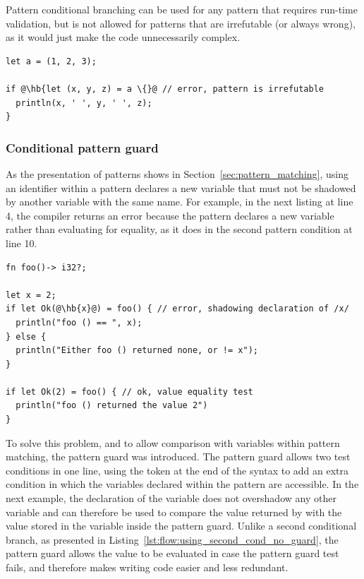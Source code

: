 Pattern conditional branching can be used for any pattern that requires run-time
validation, but is not allowed for patterns that are irrefutable (or always
wrong), as it would just make the code unnecessarily complex.

\begin{lstlisting}[style=coloredverbatimError, escapechar=@]
let a = (1, 2, 3);

if @\hb{let (x, y, z) = a \{}@ // error, pattern is irrefutable
  println(x, ' ', y, ' ', z);
}
\end{lstlisting}

\subsubsection{Conditional pattern guard}

As the presentation of patterns shows in
Section~\ref{sec:pattern_matching}, using an identifier within a pattern
declares a new variable that must not be shadowed by another variable with the
same name. For example, in the next listing at line 4, the compiler returns an
error because the pattern declares a new variable  rather than
evaluating for equality, as it does in the second pattern condition at line 10.

\begin{lstlisting}[style=coloredverbatimError, escapechar=@]
fn foo()-> i32?;

let x = 2;
if let Ok(@\hb{x}@) = foo() { // error, shadowing declaration of /x/
  println("foo () == ", x);
} else {
  println("Either foo () returned none, or != x");
}

if let Ok(2) = foo() { // ok, value equality test
  println("foo () returned the value 2")
}
\end{lstlisting}

To solve this problem, and to allow comparison with variables within pattern
matching, the pattern guard was introduced. The pattern guard allows two test
conditions in one line, using the token \token{\&\&} at the end of the syntax
 to add an extra condition in which the
variables declared within the pattern are accessible. In the next example, the
declaration of the variable  does not overshadow any other variable and
can therefore be used to compare the value returned by  with the
value stored in the variable  inside the pattern guard. Unlike a second
conditional branch, as presented in
Listing~\ref{lst:flow:using_second_cond_no_guard}, the pattern guard allows the
 value to be evaluated in case the pattern guard test fails, and
therefore makes writing code easier and less redundant.


